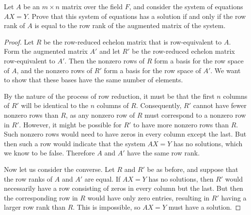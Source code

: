  Let $A$ be an $m\times n$ matrix over the field $F$, and
consider the system of equations $AX = Y$. Prove that this system of
equations has a solution if and only if the row rank of $A$ is equal
to the row rank of the augmented matrix of the system.
\begin{proof}
  Let $R$ be the row-reduced echelon matrix that is row-equivalent to
  $A$. Form the augmented matrix $A'$ and let $R'$ be the row-reduced
  echelon matrix row-equivalent to $A'$. Then the nonzero rows of $R$
  form a basis for the row space of $A$, and the nonzero rows of $R'$
  form a basis for the row space of $A'$. We want to show that these
  bases have the same number of elements.

  By the nature of the process of row reduction, it must be that the
  first $n$ columns of $R'$ will be identical to the $n$ columns of
  $R$. Consequently, $R'$ cannot have fewer nonzero rows than $R$, as
  any nonzero row of $R$ must correspond to a nonzero row in
  $R'$. However, it might be possible for $R'$ to have more nonzero
  rows than $R$. Such nonzero rows would need to have zeros in every
  column except the last. But then such a row would indicate that the
  system $AX = Y$ has no solutions, which we know to be
  false. Therefore $A$ and $A'$ have the same row rank.

  Now let us consider the converse. Let $R$ and $R'$ be as before, and
  suppose that the row ranks of $A$ and $A'$ are equal. If $AX = Y$
  has no solutions, then $R'$ would necessarily have a row consisting
  of zeros in every column but the last. But then the corresponding
  row in $R$ would have only zero entries, resulting in $R'$ having a
  larger row rank than $R$. This is impossible, so $AX = Y$ must have
  a solution.
\end{proof}
